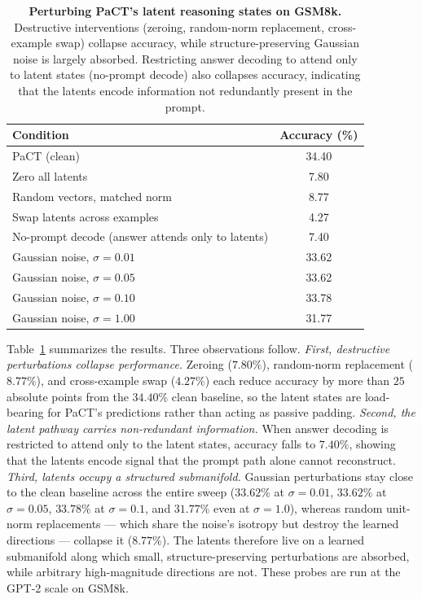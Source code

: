\begin{table}[t]
\centering
\small
\caption{\textbf{Perturbing PaCT's latent reasoning states on GSM8k.}
Destructive interventions (zeroing, random-norm replacement, cross-example swap) collapse accuracy,
while structure-preserving Gaussian noise is largely absorbed. Restricting answer decoding to attend
only to latent states (no-prompt decode) also collapses accuracy, indicating that the latents encode
information not redundantly present in the prompt.}
\label{tab:latent_perturbation}
\begin{tabular}{@{}lc@{}}
\toprule
Condition & Accuracy (\%) \\
\midrule
PaCT (clean)                                        & 34.40 \\
\midrule
Zero all latents                                    & 7.80  \\
Random vectors, matched norm                        & 8.77  \\
Swap latents across examples                        & 4.27  \\
No-prompt decode (answer attends only to latents)   & 7.40  \\
\midrule
Gaussian noise, $\sigma{=}0.01$                     & 33.62 \\
Gaussian noise, $\sigma{=}0.05$                     & 33.62 \\
Gaussian noise, $\sigma{=}0.10$                     & 33.78 \\
Gaussian noise, $\sigma{=}1.00$                     & 31.77 \\
\bottomrule
\end{tabular}
\end{table}

Table~\ref{tab:latent_perturbation} summarizes the results. Three observations follow.
\emph{First, destructive perturbations collapse performance.} Zeroing ($7.80\%$), random-norm
replacement ($8.77\%$), and cross-example swap ($4.27\%$) each reduce accuracy by more than $25$
absolute points from the $34.40\%$ clean baseline, so the latent states are load-bearing for PaCT's
predictions rather than acting as passive padding.
\emph{Second, the latent pathway carries non-redundant information.} When answer decoding is
restricted to attend only to the latent states, accuracy falls to $7.40\%$, showing that the latents
encode signal that the prompt path alone cannot reconstruct.
\emph{Third, latents occupy a structured submanifold.} Gaussian perturbations stay close to the
clean baseline across the entire sweep ($33.62\%$ at $\sigma{=}0.01$, $33.62\%$ at $\sigma{=}0.05$,
$33.78\%$ at $\sigma{=}0.1$, and $31.77\%$ even at $\sigma{=}1.0$), whereas random unit-norm
replacements — which share the noise's isotropy but destroy the learned directions — collapse it
($8.77\%$). The latents therefore live on a learned submanifold along which small,
structure-preserving perturbations are absorbed, while arbitrary high-magnitude directions are not.
These probes are run at the GPT-2 scale on GSM8k.

